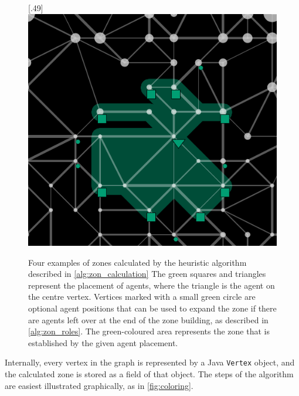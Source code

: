 \begin{figure}
  [.49\linewidth]{\includegraphics[width=.49\linewidth]{images/zone4.png}}
  \caption{Four examples of zones calculated by the heuristic algorithm described in \autoref{alg:zon_calculation}
           The green squares and triangles represent the placement of agents, where the triangle is the agent on the centre vertex.
           Vertices marked with a small green circle are optional agent positions that can be used to expand the zone if there are agents left over at the end of the zone building, as described in \autoref{alg:zon_roles}.
           The green-coloured area represents the zone that is established by the given agent placement.}
  \label{fig:zones}
\end{figure}
Internally, every vertex in the graph is represented by a Java \lstinline{Vertex} object, and the calculated zone is stored as a field of that object.
The steps of the algorithm are easiest illustrated graphically, as in \autoref{fig:coloring}.
